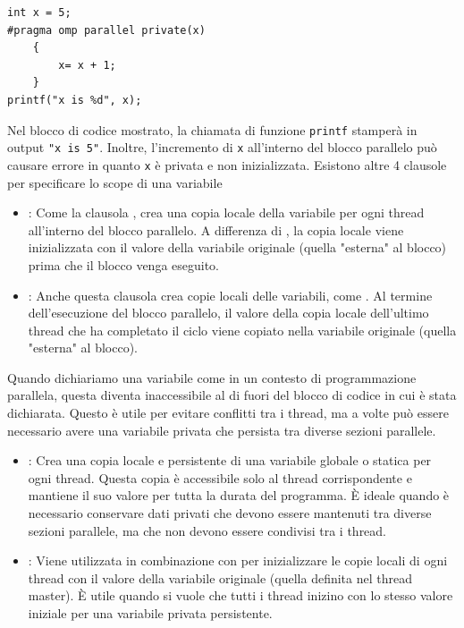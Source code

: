\documentclass[10pt, letterpaper]{report}
\begin{document}
\begin{lstlisting}[style=CStyle]
int x = 5;
#pragma omp parallel private(x)
    {
        x= x + 1;
    }
printf("x is %d", x);
\end{lstlisting}
Nel blocco di codice mostrato, la chiamata di funzione \texttt{printf} stamperà in output \texttt{"x is 5"}. Inoltre, l'incremento di \texttt{x} all'interno del blocco parallelo può causare errore in quanto \texttt{x} è privata e non inizializzata.\acc 
Esistono altre 4 clausole per specificare lo scope di una variabile\begin{itemize}
    \item {} : Come la clausola , crea una copia locale della variabile per ogni thread all'interno del blocco parallelo.
    A differenza di , la copia locale viene inizializzata con il valore della variabile originale (quella "esterna" al blocco) prima che il blocco venga eseguito.
    \item {} : Anche questa clausola crea copie locali delle variabili, come .
    Al termine dell'esecuzione del blocco parallelo, il valore della copia locale dell'ultimo thread che ha completato il ciclo viene copiato nella variabile originale (quella "esterna" al blocco).
\end{itemize}
Quando dichiariamo una variabile come  in un contesto di programmazione parallela, questa diventa inaccessibile al di fuori del blocco di codice in cui è stata dichiarata. Questo è utile per evitare conflitti tra i thread, ma a volte può essere necessario avere una variabile privata che persista tra diverse sezioni parallele.
\begin{itemize}
\item {} : Crea una copia locale e persistente di una variabile globale o statica per ogni thread. Questa copia è accessibile solo al thread corrispondente e mantiene il suo valore per tutta la durata del programma. È ideale quando è necessario conservare dati privati che devono essere mantenuti tra diverse sezioni parallele, ma che non devono essere condivisi tra i thread.
\item {} : Viene utilizzata in combinazione con  per inizializzare le copie locali di ogni thread con il valore della variabile originale (quella definita nel thread master).
È utile quando si vuole che tutti i thread inizino con lo stesso valore iniziale per una variabile privata persistente.
\end{itemize}
\end{document}
